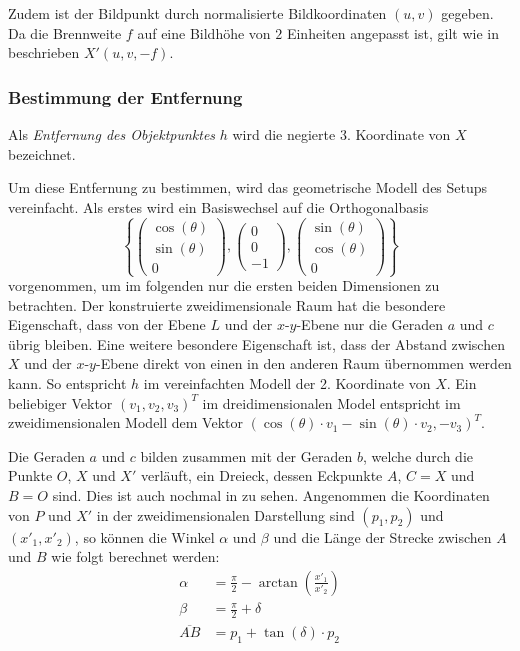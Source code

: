 \documentclass[ngerman,a4paper,parskip=half]{scrartcl}
\begin{document}
Zudem ist der Bildpunkt durch normalisierte Bildkoordinaten $(u, v)$ gegeben. Da die Brennweite $f$ auf eine Bildhöhe von $2$ Einheiten angepasst ist, gilt wie in  beschrieben $X'(u, v, -f)$.

\subsubsection{Bestimmung der Entfernung}

Als \emph{Entfernung des Objektpunktes} $h$ wird die negierte 3. Koordinate von $X$ bezeichnet.

Um diese Entfernung zu bestimmen, wird das geometrische Modell des Setups vereinfacht. Als erstes wird ein Basiswechsel auf die Orthogonalbasis
\[ \left\lbrace \begin{pmatrix}
\cos(\theta) \\ \sin(\theta) \\ 0
\end{pmatrix}, \begin{pmatrix}
0 \\ 0 \\ -1
\end{pmatrix}, \begin{pmatrix}
\sin(\theta) \\ \cos(\theta) \\ 0
\end{pmatrix} \right\rbrace \]
vorgenommen, um im folgenden nur die ersten beiden Dimensionen zu betrachten. Der konstruierte zweidimensionale Raum hat die besondere Eigenschaft, dass von der Ebene $L$ und der $x$-$y$-Ebene nur die Geraden $a$ und $c$ übrig bleiben. Eine weitere besondere Eigenschaft ist, dass der Abstand zwischen $X$ und der $x$-$y$-Ebene direkt von einen in den anderen Raum übernommen werden kann. So entspricht $h$ im vereinfachten Modell der 2. Koordinate von $X$. Ein beliebiger Vektor $(v_1, v_2, v_3)^T$ im dreidimensionalen Model entspricht im zweidimensionalen Modell dem Vektor $(\cos(\theta) \cdot v_1 - \sin(\theta) \cdot v_2, -v_3)^T$.

Die Geraden $a$ und $c$ bilden zusammen mit der Geraden $b$, welche durch die Punkte $O$, $X$ und $X'$ verläuft, ein Dreieck, dessen Eckpunkte $A$, $C = X$ und $B = O$ sind. Dies ist auch nochmal in  zu sehen. Angenommen die Koordinaten von $P$ und $X'$ in der zweidimensionalen Darstellung sind $(p_1,p_2)$ und $(x'_1, x'_2)$, so können die Winkel $\alpha$ und $\beta$ und die Länge der Strecke zwischen $A$ und $B$ wie folgt berechnet werden:
\begin{align*}
	\alpha &= \frac{\pi}{2} - \arctan\left(\frac{x'_1}{x'_2}\right)\\
	\beta &= \frac{\pi}{2} + \delta\\
	\overline{AB} &= p_1 + \tan(\delta) \cdot p_2
\end{align*}
\end{document}
